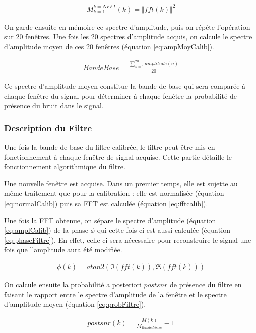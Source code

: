 \documentclass[letterpaper, twoside, 12pt, memoire, creativecommons, hyperref]{thETS}
\begin{document}
\begin{align}\label{eq:amplCalib}
   M_{k=1}^{k=NFFT}(k) = \Vert fft(k) \Vert^2 
\end{align}

On garde ensuite en mémoire ce spectre d'amplitude, puis on répète l'opération sur 20 fenêtres. Une fois les 20 spectres d'amplitude acquis, on calcule le spectre d'amplitude moyen de ces 20 fenêtres (équation \ref{eq:ampMoyCalib}).

\begin{align}\label{eq:ampMoyCalib}
   BandeBase = \frac{\sum_{n=1}^{20}amplitude(n)}{20}
\end{align}

Ce spectre d'amplitude moyen constitue la bande de base qui sera comparée à chaque fenêtre du signal pour déterminer à chaque fenêtre la probabilité de présence du bruit dans le signal.

\subsubsection{Description du Filtre}

Une fois la bande de base du filtre calibrée, le filtre peut être mis en fonctionnement à chaque fenêtre de signal acquise. Cette partie détaille le fonctionnement algorithmique du filtre. 

Une nouvelle fenêtre est acquise. Dans un premier temps, elle est sujette au même traitement que pour la calibration : elle est normalisée (équation \ref{eq:normalCalib}) puis sa FFT est calculée (équation \ref{eq:fftcalib}).

Une fois la FFT obtenue, on sépare le spectre d'amplitude (équation \ref{eq:amplCalib}) de la phase $\phi$ qui cette fois-ci est aussi calculée (équation \ref{eq:phaseFiltre}). En effet, celle-ci sera nécessaire pour reconstruire le signal une fois que l'amplitude aura été modifiée.

\begin{align}\label{eq:phaseFiltre}
   \phi(k) = atan2(\Im(fft(k)), \Re(fft(k)))
\end{align}

On calcule ensuite la probabilité a posteriori $postsnr$ de présence du filtre en faisant le rapport entre le spectre d'amplitude de la fenêtre et le spectre d'amplitude moyen (équation \ref{eq:probFiltre}).

\begin{align}\label{eq:probFiltre}
   postsnr(k) = \frac{M(k)}{M_{Bande de base}} - 1
\end{align}
\end{document}

